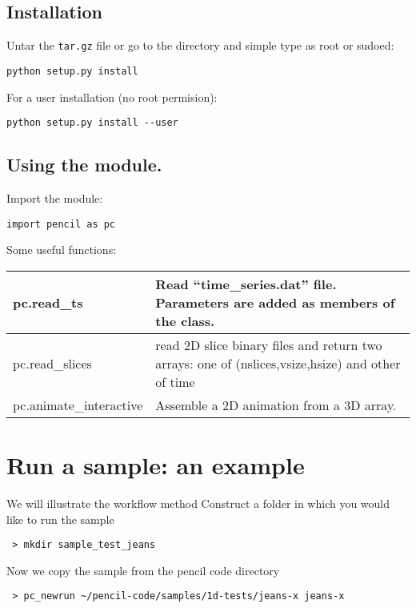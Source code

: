 \documentclass[a4paper,12pt]{article}
\begin{document}
\subsection{Installation}
Untar the \texttt{tar.gz} file or go to the directory and simple type as root or sudoed:
\begin{verbatim}
python setup.py install
\end{verbatim}
For a user installation (no root permision):
\begin{verbatim}
python setup.py install --user
\end{verbatim}

\subsection{Using the module.}
Import the module:
\begin{verbatim}
import pencil as pc
\end{verbatim}
Some useful functions:
\begin{center}
\begin{tabular}{|l|l|}\hline
pc.read\_ts & Read ``time\_series.dat'' file. Parameters are added as members of the class. \\\hline
pc.read\_slices & read 2D slice binary files and return two arrays: one of (nslices,vsize,hsize) and other of time\\\hline
pc.animate\_interactive &  Assemble a 2D animation from a 3D array. \\\hline
\end{tabular}
\end{center}

\section{Run a sample: an example}
We will illustrate the workflow method 
Construct a folder in which you would like to run the sample
\begin{verbatim}
 > mkdir sample_test_jeans
\end{verbatim}

Now we copy the sample from the pencil code directory
\begin{verbatim}
 > pc_newrun ~/pencil-code/samples/1d-tests/jeans-x jeans-x
\end{verbatim}
\end{document}
